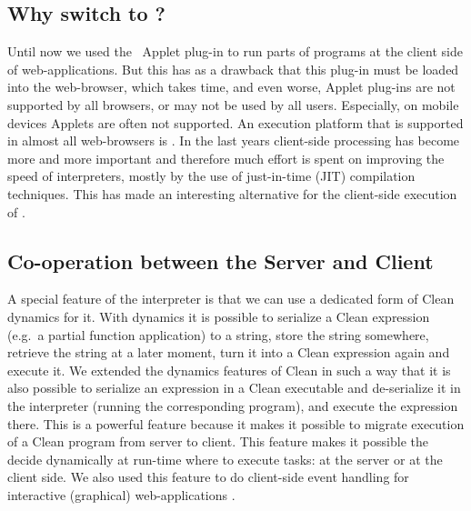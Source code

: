 \subsection{Why switch to \JS?}
Until now we used  the \Sapl\ \Java Applet plug-in to run parts of \Clean programs at the client side of web-applications.
But this has as a drawback that this plug-in must be loaded into the web-browser, which 
takes time, and  even worse, \Java Applet plug-ins are not supported by all browsers, 
or may not be used by all users.
Especially, on mobile devices \Java Applets are often not supported.
An execution platform that is supported in almost all web-browsers is \JS.
In the last years client-side processing has become more and more important and therefore
much effort is spent on improving the speed of \JS interpreters,
mostly by the use of just-in-time (\textsf{JIT}) compilation techniques.
This has made \JS an interesting alternative for the client-side execution of \Sapl.

\subsection{Co-operation between the Server and Client}
A special feature of the \Sapl interpreter is that we can use a dedicated form of \textsf{Clean} 
dynamics \cite{DYNAMICS} for it. With dynamics it is possible to serialize a \textsf{Clean} expression 
(e.g.\ a partial function application) to a string, store the string somewhere, retrieve the string at a later moment, turn it into a 
\textsf{Clean} expression again and execute it. We extended the dynamics features of \textsf{Clean} in 
such a way that it is also possible to serialize an expression in a \textsf{Clean} executable and de-serialize it in the \Sapl interpreter (running the corresponding \Sapl program), and execute the 
expression there. This is a powerful feature because it makes it possible to migrate execution of a 
\textsf{Clean} program from server to client.  
This feature makes it possible the decide dynamically at run-time where to execute tasks:
at the server or at the client side.
We also used this feature to do client-side event handling for interactive (graphical) web-applications 
\cite{iEditors}. 

